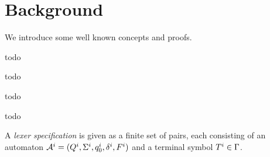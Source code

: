 \section{Background}
We introduce some well known concepts and proofs.

\begin{definition}
	\label{def:Pushdown Automata}
	todo
\end{definition}

\begin{definition}
	\label{def:Context-Free Grammar}
	todo
\end{definition}

\begin{theorem}
    \label{thm:pda-equiv}

\end{theorem}

\begin{definition}
	\label{def:Finite-State Transducer}
	todo
\end{definition}

\begin{definition}
	\label{def:Finite-State Automata}
	todo
\end{definition}

\begin{definition}
	\label{def:LexerSpecification}
    A \emph{lexer specification} is given as a finite set of pairs, each consisting of an automaton $\mathcal{A}^i = (Q^i, \Sigma^i, q_{0}^{i}, \delta^i, F^i)$ and a terminal symbol $T^i \in \Gamma$.
\end{definition}
